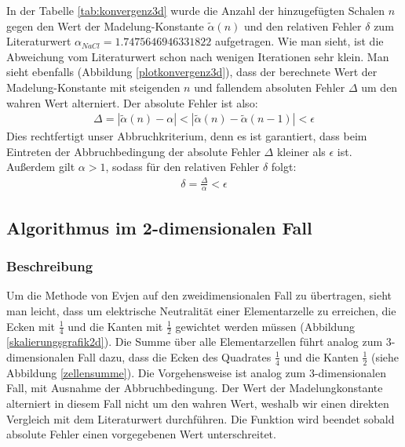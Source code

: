 \documentclass[10pt,a4paper]{article}
\begin{document}
In der Tabelle \ref{tab:konvergenz3d} wurde die Anzahl der hinzugefügten Schalen $n$
gegen den Wert der Madelung-Konstante $\tilde{\alpha}(n)$ und den relativen Fehler $\delta$ zum
Literaturwert $\alpha_{NaCl} = 1.7475646946331822$ \cite{Sakamoto} aufgetragen.
Wie man sieht, ist die Abweichung vom Literaturwert schon nach wenigen Iterationen
sehr klein.
Man sieht ebenfalls (Abbildung \ref{plotkonvergenz3d}), dass der berechnete Wert
der Madelung-Konstante mit steigenden $n$ und fallendem absoluten Fehler $\Delta$ um
den wahren Wert alterniert. Der absolute Fehler ist also:
\begin{align}
	\Delta = | \tilde{\alpha}(n) - \alpha | < | \tilde{\alpha}(n) - \tilde{\alpha}(n-1)| < \epsilon
\end{align}
Dies rechtfertigt unser Abbruchkriterium, denn es ist garantiert, dass beim Eintreten der
Abbruchbedingung der absolute Fehler $\Delta$ kleiner als $\epsilon$ ist.
Außerdem gilt $\alpha > 1$, sodass für den relativen Fehler $\delta$ folgt:
\begin{align}
	\delta = \frac{\Delta}{\alpha} < \epsilon
\end{align}

\subsection{Algorithmus im 2-dimensionalen Fall}
\subsubsection{Beschreibung}
Um die Methode von Evjen auf den zweidimensionalen Fall zu übertragen, sieht man leicht,
dass um elektrische Neutralität einer Elementarzelle zu erreichen, die Ecken mit $\frac{1}{4}$
und die Kanten mit $\frac{1}{2}$ gewichtet werden müssen (Abbildung \ref{skalierungsgrafik2d}).
Die Summe über alle Elementarzellen führt analog zum 3-dimensionalen Fall dazu, dass die Ecken
des Quadrates $\frac{1}{4}$ und die Kanten $\frac{1}{2}$ (siehe Abbildung \ref{zellensumme}).
Die Vorgehensweise ist analog zum 3-dimensionalen Fall, mit Ausnahme der Abbruchbedingung.
Der Wert der Madelungkonstante alterniert in diesem Fall nicht um den wahren Wert, weshalb
wir einen direkten Vergleich mit dem Literaturwert durchführen. Die Funktion wird beendet
sobald absolute Fehler einen vorgegebenen Wert unterschreitet.
\end{document}
